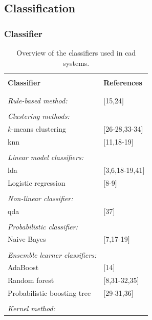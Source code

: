 \subsection{Classification} \label{subsec:classification}

\subsubsection{Classifier}

\begin{table}
	\caption{Overview of the classifiers used in \ac{cad} systems.}
	\small
	\begin{tabular}{p{.60\linewidth} p{.30\linewidth}}
		\hline \\ [-1.5ex]
		\textbf{Classifier} & \textbf{References} \\ \\ [-1.5ex]
		\hline \\ [-1.5ex]
		\textit{Rule-based method:} & $[$15,24$]$ \\ \\ [-1.5ex]
		\textit{Clustering methods:} & \\
		\quad $k$-means clustering & $[$26-28,33-34$]$ \\
		\quad \acs{knn} & $[$11,18-19$]$ \\ \\ [-1.5ex]
		\textit{Linear model classifiers:} & \\
		\quad \acs{lda} & $[$3,6,18-19,41$]$ \\
		\quad Logistic regression & $[$8-9$]$ \\ \\ [-1.5ex]
		\textit{Non-linear classifier:} & \\
		\quad \acs{qda} & $[$37$]$ \\ \\ [-1.5ex]
		\textit{Probabilistic classifier:} & \\
		\quad Naive Bayes & $[$7,17-19$]$ \\ \\ [-1.5ex]
		\textit{Ensemble learner classifiers:} & \\
		\quad AdaBoost & $[$14$]$ \\
		\quad Random forest & $[$8,31-32,35$]$ \\
		\quad Probabilistic boosting tree & $[$29-31,36$]$ \\ \\ [-1.5ex]
		\textit{Kernel method:} & \\

\end{tabular}
\end{table}

